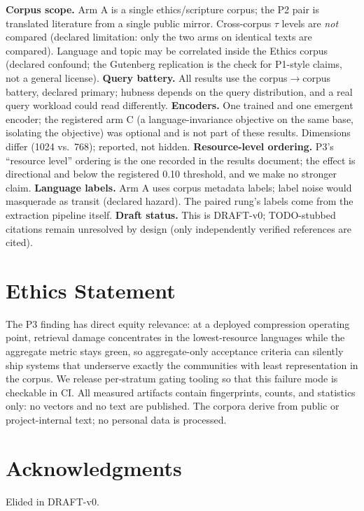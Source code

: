\documentclass[11pt]{article}
\begin{document}
\textbf{Corpus scope.} Arm A is a single ethics/scripture corpus; the P2
pair is translated literature from a single public mirror. Cross-corpus
$\tau$ levels are \emph{not} compared (declared limitation: only the two
arms on identical texts are compared). Language and topic may be
correlated inside the Ethics corpus (declared confound; the Gutenberg
replication is the check for P1-style claims, not a general license).
\textbf{Query battery.} All results use the corpus$\to$corpus battery,
declared primary; hubness depends on the query distribution, and a real
query workload could read differently.
\textbf{Encoders.} One trained and one emergent encoder; the registered
arm C (a language-invariance objective on the same base, isolating the
objective) was optional and is not part of these results. Dimensions
differ (1024 vs.\ 768); reported, not hidden.
\textbf{Resource-level ordering.} P3's ``resource level'' ordering is the
one recorded in the results document; the effect is directional and below
the registered 0.10 threshold, and we make no stronger claim.
\textbf{Language labels.} Arm A uses corpus metadata labels; label noise
would masquerade as transit (declared hazard). The paired rung's labels
come from the extraction pipeline itself.
\textbf{Draft status.} This is DRAFT-v0; TODO-stubbed citations remain
unresolved by design (only independently verified references are cited).

\section*{Ethics Statement}

The P3 finding has direct equity relevance: at a deployed compression
operating point, retrieval damage concentrates in the lowest-resource
languages while the aggregate metric stays green, so aggregate-only
acceptance criteria can silently ship systems that underserve exactly the
communities with least representation in the corpus. We release
per-stratum gating tooling so that this failure mode is checkable in CI.
All measured artifacts contain fingerprints, counts, and statistics only:
no vectors and no text are published. The corpora derive from public or
project-internal text; no personal data is processed.

\section*{Acknowledgments}

Elided in DRAFT-v0.
\end{document}
